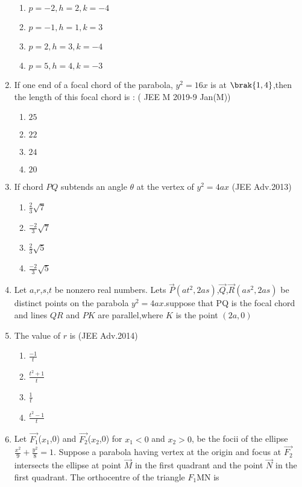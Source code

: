 \begin{enumerate}
	       \begin{enumerate}
		      \item $p=-2,h=2,k=-4$
		      \item $p=-1,h=1,k=3$
		      \item $p=2,h=3,k=-4$
		      \item $p=5,h=4,k=-3$


	       \end{enumerate}
\item If one end of a focal chord of the parabola, $y^2=16x$ is at $\brak{1,4}$,then the length of this focal chord is :
     \hfill{( JEE M 2019-9 Jan(M))}
	\begin{enumerate}
    		\item $25$
    		\item $22$
    		\item $24$
    		\item $20$
	\end{enumerate}    
\item If chord $PQ$ subtends an angle $\theta$  at the vertex of $y^2=4ax$
\hfill(JEE Adv.2013)

\begin{enumerate}
    \item $\frac{2}{3}\sqrt{7}$
    
    \item $\frac{-2}{3}\sqrt{7}$
    
    \item $\frac{2}{3}\sqrt{5}$
    
    \item $\frac{-2}{3}\sqrt{5}$
\end{enumerate}
\item[] Let $a$,$r$,$s$,$t$ be nonzero real numbers. Lets $\Vec{P}$$(at^2,2as)$,$\Vec{Q}$,$\Vec{R}$$(as^2,2as)$ be distinct points on the parabola $y^2=4ax$.suppose that PQ is the focal chord and lines $QR$ and $PK$ are parallel,where $K$ is the point $(2a,0)$
\item The value of $r$ is 
\hfill(JEE Adv.2014)
\begin{enumerate}
    \item $\frac{-1}{t}$ 
    \item $\frac{t^2+1}{t}$
    \item $\frac{1}{t}$
    \item $\frac{t^2-1}{t}$
\end{enumerate}
\item[] Let $\vec{F_1}$($x_1$,0) and  $\vec{F_2}$($x_2$,0) for $x_1<0$ and $x_2>0$, be the focii of the ellipse $\frac{x^2}{9}+\frac{y^2}{8} =1$. Suppose a parabola having vertex at the origin and focus at $\vec{F_2}$ intersects the ellipse at point $\Vec{M}$ in the first quadrant and the point $\Vec{N}$ in the first quadrant.
The orthocentre of the triangle $F_1$MN is


\end{enumerate}
